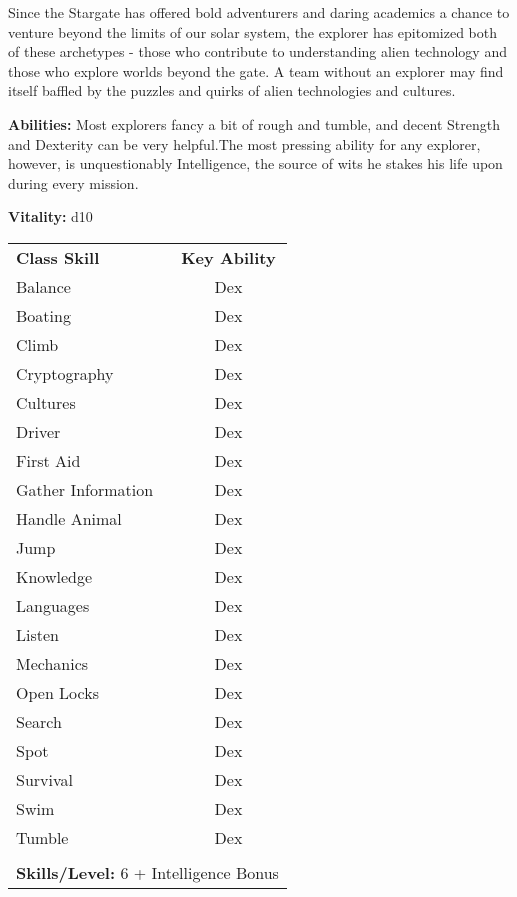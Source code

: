 \begin{multicols}{2}

Since the Stargate has offered bold adventurers and daring academics a chance to venture beyond the limits of our solar system, the explorer has epitomized both of these archetypes - those who contribute to understanding alien technology and those who explore worlds beyond the gate. A team without an explorer may find itself baffled by the puzzles and quirks of alien technologies and cultures.

\textbf{Abilities:} Most explorers fancy a bit of rough and tumble, and decent Strength and Dexterity can be very helpful.The most pressing ability for any explorer, however, is unquestionably Intelligence, the source of wits he stakes his life upon during every mission.

\textbf{Vitality:} d10

\end{multicols}

\begin{table}[htb]
\raggedright
\begin{tabular}{l c}
\textbf{Class Skill} & \textbf{Key Ability}\\

Balance & Dex\\
Boating & Dex\\
Climb & Dex\\
Cryptography & Dex\\
Cultures & Dex\\
Driver & Dex\\
First Aid & Dex\\
Gather Information & Dex\\
Handle Animal & Dex\\
Jump & Dex\\
Knowledge & Dex\\
Languages & Dex\\
Listen & Dex\\
Mechanics & Dex\\
Open Locks & Dex\\
Search & Dex\\
Spot & Dex\\
Survival & Dex\\
Swim & Dex\\
Tumble & Dex\\

\multicolumn{2}{l}{\cellcolor{white}}\\
\multicolumn{2}{l}{\cellcolor{white}\textbf{Skills/Level:} 6 + Intelligence Bonus}\\
\end{tabular}
\end{table}

